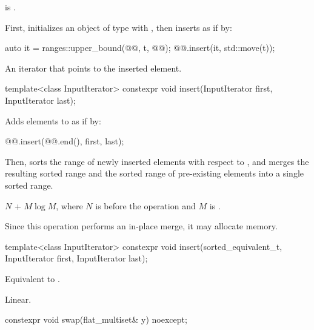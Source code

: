 \begin{itemdescr}
\pnum
\constraints
{} is .

\pnum
\effects
First, initializes an object  of type 
with ,
then inserts  as if by:
\begin{codeblock}
auto it = ranges::upper_bound(@@, t, @@);
@@.insert(it, std::move(t));
\end{codeblock}

\pnum
\returns
An iterator that points to the inserted element.
\end{itemdescr}

%
\begin{itemdecl}
template<class InputIterator>
  constexpr void insert(InputIterator first, InputIterator last);
\end{itemdecl}

\begin{itemdescr}
\pnum
\effects
Adds elements to  as if by:
\begin{codeblock}
@@.insert(@@.end(), first, last);
\end{codeblock}
Then, sorts the range of newly inserted elements with respect to ,
and merges the resulting sorted range and
the sorted range of pre-existing elements into a single sorted range.

\pnum
\complexity
$N$ + $M \log M$, where $N$ is  before the operation and $M$
is .

\pnum
\remarks
Since this operation performs an in-place merge, it may allocate memory.
\end{itemdescr}

%
\begin{itemdecl}
template<class InputIterator>
  constexpr void insert(sorted_equivalent_t, InputIterator first, InputIterator last);
\end{itemdecl}

\begin{itemdescr}
\pnum
\effects
Equivalent to .

\pnum
\complexity
Linear.
\end{itemdescr}

%
\begin{itemdecl}
constexpr void swap(flat_multiset& y) noexcept;
\end{itemdecl}

